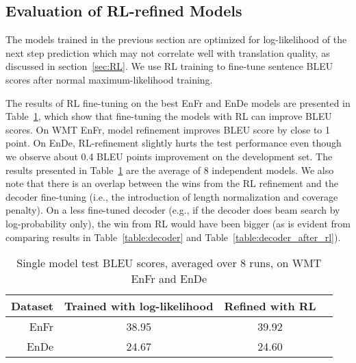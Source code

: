 \subsection{Evaluation of RL-refined Models}
The models trained in the previous section are optimized for
log-likelihood of the next step prediction
which may not correlate well with translation quality, as discussed in
section~\ref{sec:RL}. We use RL training to fine-tune sentence BLEU scores
after normal maximum-likelihood training.

The results of RL fine-tuning on the best EnFr and
EnDe models are presented in
Table~\ref{table:rl_wmt_en_fr}, which show that fine-tuning the
models with RL can improve BLEU scores. On WMT EnFr,
model refinement improves BLEU score by close to 1 point. On EnDe,
RL-refinement slightly hurts the test performance even though we observe about 0.4 BLEU points
improvement on the development set. The results presented in
Table~\ref{table:rl_wmt_en_fr} are the average of 8 independent models.
We also note that there is an overlap between the wins from the RL refinement and the decoder 
fine-tuning (i.e., the introduction of length normalization and coverage penalty).
On a less fine-tuned decoder (e.g., if the decoder does beam search by
log-probability only), the win from RL would have been bigger (as is evident
from comparing results in Table~\ref{table:decoder} and
Table~\ref{table:decoder_after_rl}).

\begin{table}[h!]
\caption{Single model test BLEU scores, averaged over 8 runs, on WMT EnFr and
  EnDe}
\label{table:rl_wmt_en_fr}
\centering
\begin{tabular}{r c c c }
\hline\hline Dataset & Trained with log-likelihood   & Refined with RL  \\\hline
       EnFr  & 38.95                  & 39.92           \\ \hline
       EnDe  & 24.67                  & 24.60           \\
\hline \end{tabular}
\end{table}


